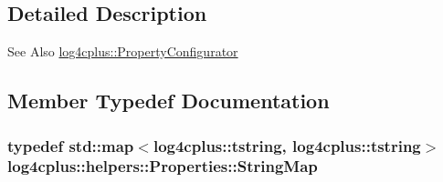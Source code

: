 \subsection{Detailed Description}
\begin{DoxySeeAlso}{See Also}
\hyperlink{classlog4cplus_1_1PropertyConfigurator}{log4cplus\-::\-Property\-Configurator} 
\end{DoxySeeAlso}


\subsection{Member Typedef Documentation}
\hypertarget{classlog4cplus_1_1helpers_1_1Properties_a2e9fc9f64f8bc7de9f22021aedd25f1d}{
\subsubsection[{String\-Map}]{\setlength{\rightskip}{0pt plus 5cm}typedef std\-::map$<${\bf log4cplus\-::tstring}, {\bf log4cplus\-::tstring}$>$ {\bf log4cplus\-::helpers\-::\-Properties\-::\-String\-Map}\hspace{0.3cm}{\ttfamily [protected]}}}\label{classlog4cplus_1_1helpers_1_1Properties_a2e9fc9f64f8bc7de9f22021aedd25f1d}


